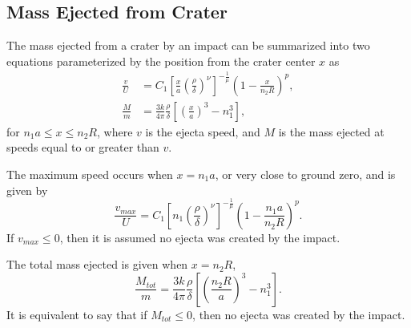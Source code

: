 \documentclass{article}
\begin{document}
\subsection{Mass Ejected from Crater}\label{ssec:Mass Ejected from Crater}

The mass ejected from a crater by an impact can be summarized into two equations parameterized by the position from the crater center $x$ as
\begin{align}\label{eq:v/U}
\frac{v}{U} &= C_1\left[\frac{x}{a}\left(\frac{\rho}{\delta}\right)^\nu\right]^{-\frac{1}{\mu}}\left(1 - \frac{x}{n_2 R}\right)^p,\\
\frac{M}{m} &= \frac{3k}{4\pi}\frac{\rho}{\delta}\left[\left(\frac{x}{a}\right)^3-n_1^3\right],\label{eq:M_HH11}
\end{align}
for $n_1 a \le x \le n_2 R$, where $v$ is the ejecta speed, and $M$ is the mass ejected at speeds equal to or greater than $v$.

The maximum speed occurs when $x = n_1 a$, or very close to ground zero, and is given by
\begin{equation}\label{eq:vmax}
\frac{v_{max}}{U} = C_1\left[n_1\left(\frac{\rho}{\delta}\right)^\nu\right]^{-\frac{1}{\mu}}\left(1 - \frac{n_1 a}{n_2 R}\right)^p.
\end{equation}
If $v_{max} \le 0$, then it is assumed no ejecta was created by the impact.

The total mass ejected is given when $x = n_2 R$,
\begin{equation}\label{eq:Mtot}
\frac{M_{tot}}{m} = \frac{3k}{4\pi}\frac{\rho}{\delta}\left[\left(\frac{n_2 R}{a}\right)^3-n_1^3\right].
\end{equation}
It is equivalent to say that if $M_{tot} \le 0$, then no ejecta was created by the impact.
\end{document}
